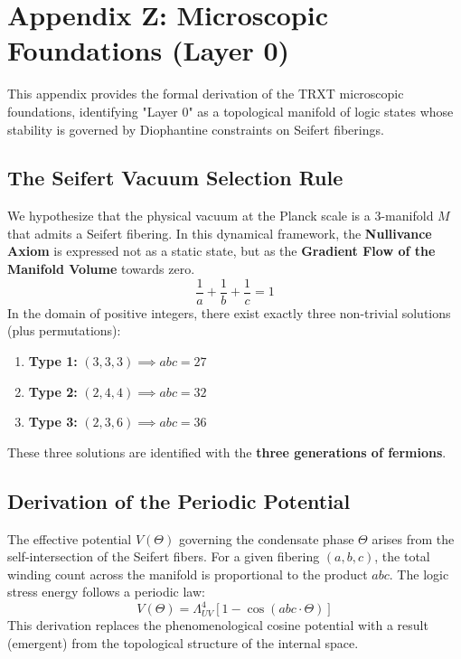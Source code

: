 \section{Appendix Z: Microscopic Foundations (Layer 0)}
\label{app:microscopic_foundations}

This appendix provides the formal derivation of the TRXT microscopic foundations, identifying "Layer 0" as a topological manifold of logic states whose stability is governed by Diophantine constraints on Seifert fiberings.

\subsection{The Seifert Vacuum Selection Rule}
We hypothesize that the physical vacuum at the Planck scale is a 3-manifold $M$ that admits a Seifert fibering. In this dynamical framework, the \textbf{Nullivance Axiom} is expressed not as a static state, but as the \textbf{Gradient Flow of the Manifold Volume} towards zero.
\begin{equation}
    \frac{1}{a} + \frac{1}{b} + \frac{1}{c} = 1
\end{equation}
In the domain of positive integers, there exist exactly three non-trivial solutions (plus permutations):
\begin{enumerate}
    \item \textbf{Type 1:} $(3, 3, 3) \implies abc = 27$
    \item \textbf{Type 2:} $(2, 4, 4) \implies abc = 32$
    \item \textbf{Type 3:} $(2, 3, 6) \implies abc = 36$
\end{enumerate}
These three solutions are identified with the \textbf{three generations of fermions}.

\subsection{Derivation of the Periodic Potential}
The effective potential $V(\Theta)$ governing the condensate phase $\Theta$ arises from the self-intersection of the Seifert fibers. For a given fibering $(a, b, c)$, the total winding count across the manifold is proportional to the product $abc$. The logic stress energy follows a periodic law:
\begin{equation}
    V(\Theta) = \Lambda_{UV}^4 \left[ 1 - \cos(abc \cdot \Theta) \right]
\end{equation}
This derivation replaces the phenomenological cosine potential with a result  (emergent) from the topological structure of the internal space.

